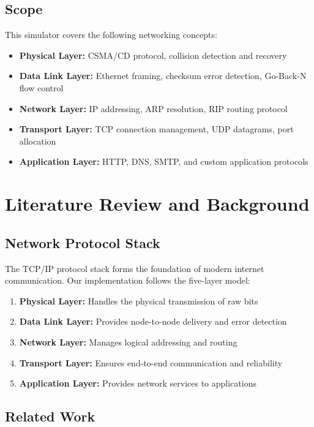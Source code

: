 \documentclass[12pt,a4paper]{article}
\begin{document}
\subsection{Scope}

This simulator covers the following networking concepts:

\begin{itemize}
\item \textbf{Physical Layer:} CSMA/CD protocol, collision detection and recovery
\item \textbf{Data Link Layer:} Ethernet framing, checksum error detection, Go-Back-N flow control
\item \textbf{Network Layer:} IP addressing, ARP resolution, RIP routing protocol
\item \textbf{Transport Layer:} TCP connection management, UDP datagrams, port allocation
\item \textbf{Application Layer:} HTTP, DNS, SMTP, and custom application protocols
\end{itemize}

\newpage

\section{Literature Review and Background}

\subsection{Network Protocol Stack}

The TCP/IP protocol stack forms the foundation of modern internet communication. Our implementation follows the five-layer model:

\begin{enumerate}
\item \textbf{Physical Layer:} Handles the physical transmission of raw bits
\item \textbf{Data Link Layer:} Provides node-to-node delivery and error detection
\item \textbf{Network Layer:} Manages logical addressing and routing
\item \textbf{Transport Layer:} Ensures end-to-end communication and reliability
\item \textbf{Application Layer:} Provides network services to applications
\end{enumerate}

\subsection{Related Work}
\end{document}
